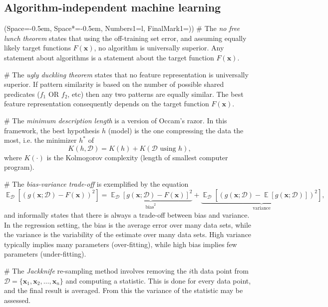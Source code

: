 \documentclass[12pt, a4paper]{article}
\newcommand{\listSpace}{-0.5em}%
\newcommand{\D}{\mathcal{D}}
\newcommand{\vect}[1]{\bm{#1}}
\DeclareMathOperator{\E}{\mathbb{E}}
\begin{document}
\subsection{Algorithm-independent machine learning}
\begin{easylist}[itemize]
\ListProperties(Space=\listSpace, Space*=\listSpace, Numbers1=l, FinalMark1={)})
# The \emph{no free lunch theorem} states that using the off-training set error, and assuming equally likely target functions $F(\vect{x})$, no algorithm is universally superior.
Any statement about algorithms is a statement about the target function $F(\vect{x})$.

# The \emph{ugly duckling theorem} states that no feature representation is universally superior. 
If pattern similarity is based on the number of possible shared predicates ($f_1$ OR $f_2$, etc) then any two patterns are equally similar.
The best feature representation consequently depends on the target function $F(\vect{x})$.

# The \emph{minimum description length} is a version of Occam's razor.
In this framework, the best hypothesis $h$ (model) is the one compressing the data the most, i.e. the minimizer $h^*$ of
\begin{equation*}
	K(h, \D) = K(h) + K(\D \text{ using } h),
\end{equation*}
where $K(\cdot)$ is the Kolmogorov complexity (length of smallest computer program).

# The \emph{bias-variance trade-off} is exemplified by the equation
\begin{equation*}
	\E_\D \left[  \left( g(\vect{x}; \D) - F(\vect{x}) \right)^2  \right]
	=
	\underbrace{\E_\D \left[ g(\vect{x}; \D) - F(\vect{x})  \right]^2}_{\text{bias}^2}
	+
	\underbrace{\E_\D \left[  \left( g(\vect{x}; \D) - \E \left[ g(\vect{x}; \D) \right] \right)^2  \right]}_{\text{variance}},
\end{equation*}
and informally states that there is always a trade-off between bias and variance.
In the regression setting, the bias is the average error over many data sets, while the variance is the variability of the estimate over many data sets.
High variance typically implies many parameters (over-fitting), while high bias implies few parameters (under-fitting).

# The \emph{Jackknife} re-sampling method involves removing the $i$th data point from $\D = \{\vect{x}_1, \vect{x}_2, \dots, \vect{x}_n\}$ and computing a statistic.
This is done for every data point, and the final result is averaged.
From this the variance of the statistic may be assessed. 


\end{easylist}
\end{document}
